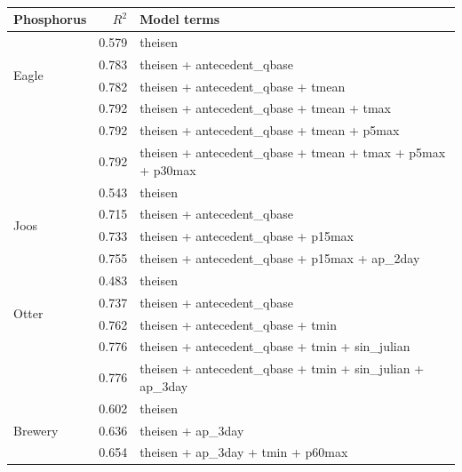 \documentclass[12pt]{article}
\begin{document}
\begin{table}[h]
\begin{center}
\begin{tabular}{lrl}
    \textbf{Phosphorus} & $R^2$ & Model terms \\
    \hline
    \multirow{4}{*}{Eagle} & 0.579 & theisen\\
    & 0.783 & theisen + antecedent\_qbase\\
    & 0.782 & theisen + antecedent\_qbase + tmean\\
    & 0.792 & theisen + antecedent\_qbase + tmean + tmax \\
    & 0.792 & theisen + antecedent\_qbase + tmean + p5max \\
    & 0.792 & theisen + antecedent\_qbase + tmean + tmax + p5max + p30max
    \vspace{2mm}\\
    \multirow{4}{*}{Joos} & 0.543 & theisen\\
    & 0.715 & theisen + antecedent\_qbase\\
    & 0.733 & theisen + antecedent\_qbase + p15max\\
    & 0.755 & theisen + antecedent\_qbase + p15max + ap\_2day
    \vspace{2mm}\\
    \multirow{4}{*}{Otter} & 0.483 & theisen\\
    & 0.737 & theisen + antecedent\_qbase\\
    & 0.762 & theisen + antecedent\_qbase + tmin\\
    & 0.776 & theisen + antecedent\_qbase + tmin + sin\_julian\\
    & 0.776 & theisen + antecedent\_qbase + tmin + sin\_julian + ap\_3day
    \vspace{2mm}\\
    \multirow{3}{*}{Brewery} & 0.602 & theisen\\
    & 0.636 & theisen + ap\_3day\\
    & 0.654 & theisen + ap\_3day + tmin + p60max\\

    \end{tabular}
    \caption{\label{r_square_nosnow}}
    \end{center}
\end{table}
\end{document}

